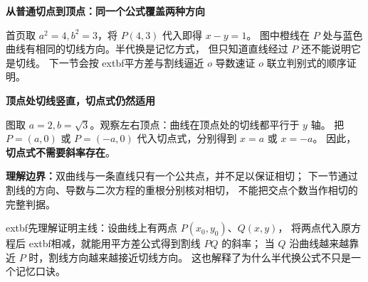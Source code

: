 \clearpage
\begin{explanationbox}
\textbf{从普通切点到顶点：同一个公式覆盖两种方向}

首页取 $a^2=4,b^2=3$，将 $P(4,3)$ 代入即得 $x-y=1$。
图中橙线在 $P$ 处与蓝色曲线有相同的切线方向。半代换是记忆方式，
但只知道直线经过 $P$ 还不能说明它是切线。
下一节会按	extbf{平方差与割线逼近 $	o$ 导数速证 $	o$ 联立判别式}的顺序证明。

\begin{center}
\textbf{顶点处切线竖直，切点式仍然适用}\par\medskip

\end{center}
图取 $a=2,b=\sqrt3$。观察左右顶点：曲线在顶点处的切线都平行于 $y$ 轴。
把 $P=(a,0)$ 或 $P=(-a,0)$ 代入切点式，分别得到 $x=a$ 或 $x=-a$。
因此，\textbf{切点式不需要斜率存在}。

\textbf{理解边界：}双曲线与一条直线只有一个公共点，并不足以保证相切；
下一节通过割线的方向、导数与二次方程的重根分别核对相切，
不能把交点个数当作相切的完整判据。

	extbf{先理解证明主线：}设曲线上有两点 $P(x_0,y_0)$、$Q(x,y)$，
将两点代入原方程后	extbf{相减}，就能用平方差公式得到割线 $PQ$ 的斜率；
当 $Q$ 沿曲线越来越靠近 $P$ 时，割线方向越来越接近切线方向。
这也解释了为什么半代换公式不只是一个记忆口诀。
\end{explanationbox}
